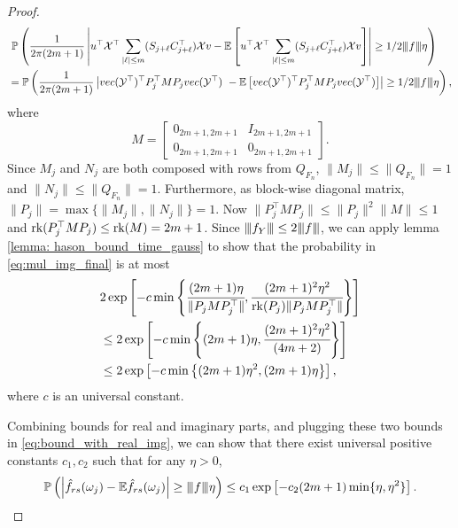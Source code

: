 \begin{proof}
\begin{equation}
\label{eq:mul_img_final}
\begin{aligned}
&~\mathbb{P}\left(\frac{1}{2\pi(2m+1)}\left|u^\top \mathcal{\mathcal{X}}^\top\sum_{|\ell|\le m}(S_{j+\ell}C_{j+\ell}^\top)\mathcal{\mathcal{X}}  v - \mathbb{E}\left[u^\top \mathcal{X}^\top\sum_{|\ell|\le m}(S_{j+\ell}C_{j+\ell}^\top)\mathcal{X}  v\right]\right|\ge 1/2{\left\vert\kern-0.25ex\left\vert\kern-0.25ex\left\vert f \right\vert\kern-0.25ex\right\vert\kern-0.25ex\right\vert} \eta \right)\\
& = \mathbb{P}\left(\frac{1}{2\pi(2m+1)}\left|vec(\mathcal{Y}^\top)^\top P_j^\top MP_j vec(\mathcal{Y}^\top)\ - \mathbb{E} \left[vec(\mathcal{Y}^\top)^\top P_j^\top MP_j vec(\mathcal{Y}^\top)\right]\right|\ge 1/2{\left\vert\kern-0.25ex\left\vert\kern-0.25ex\left\vert f \right\vert\kern-0.25ex\right\vert\kern-0.25ex\right\vert}\eta\right),
\end{aligned}
\end{equation}
where 
\begin{equation}
M = \left[
\begin{array}{ll}
0_{2m+1,2m+1} & I_{2m+1,2m+1}\\
0_{2m+1,2m+1} & 0_{2m+1,2m+1}
\end{array}
\right]. \nonumber 
\end{equation}
Since $M_j$ and $N_j$ are both composed with rows from $Q_{F_n}$, $\|M_j\|\le \|Q_{F_n}\|=1$ and $\|N_j\|\le \|Q_{F_n}\|=1$. Furthermore, as block-wise diagonal matrix, $\|P_j\|=\max\{\|M_j\|, \|N_j\|\}=1$. 
Now $\|P_j^\top M P_j\|\le \|P_j\|^2\|M\| \le 1$ and $\mbox{rk}(P_j^\top M P_j) \le \mbox{rk}(M) = 2m+1$. Since ${\left\vert\kern-0.25ex\left\vert\kern-0.25ex\left\vert f_Y \right\vert\kern-0.25ex\right\vert\kern-0.25ex\right\vert}\le 2{\left\vert\kern-0.25ex\left\vert\kern-0.25ex\left\vert f \right\vert\kern-0.25ex\right\vert\kern-0.25ex\right\vert}$, we can apply lemma \ref{lemma: hason_bound_time_gauss} to show that the probability in  \eqref{eq:mul_img_final} is at most 
\begin{equation}
\begin{aligned}
&2\exp\left[-c\min\left\{\cfrac{(2m+1)\eta}{\|P_jMP_j^\top\|}, \cfrac{(2m+1)^2\eta^2}{\mbox{rk}(P_j)\|P_jMP_j^\top\|}\right\}\right] \\
&\le 2\exp\left[-c\min\left\{(2m+1)\eta, \cfrac{(2m+1)^2\eta^2}{(4m+2)}\right\}\right] \\
& \le 2\exp\left[-c\min\left\{(2m+1)\eta^2, (2m+1)\eta\right\}\right], \nonumber 
\end{aligned}
\end{equation}
where $c$ is an universal constant. 


Combining bounds for real and imaginary parts, and plugging these two bounds in  \eqref{eq:bound_with_real_img}, we can show that there exist universal positive constants $c_1, c_2$ such that for any $\eta > 0$, 
\begin{equation}
\mathbb{P}\left(\left|\hat{f}_{rs}(\omega_j) - \mathbb{E}\hat{f}_{rs}(\omega_j)\right| \ge {\left\vert\kern-0.25ex\left\vert\kern-0.25ex\left\vert f \right\vert\kern-0.25ex\right\vert\kern-0.25ex\right\vert}\eta\right)\le c_1\exp\left[-c_2(2m+1)\min\{\eta, \eta^2\}\right].
\end{equation}
\end{proof}


